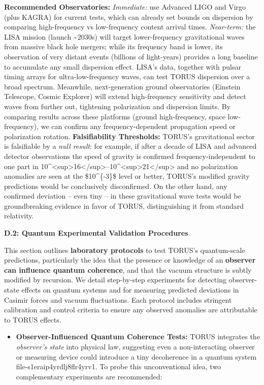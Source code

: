 \documentclass[]{article}
\begin{document}
\textbf{Recommended Observatories:} \emph{Immediate:} use Advanced LIGO
and Virgo (plus KAGRA) for current tests, which can already set bounds
on dispersion by comparing high-frequency vs low-frequency content
arrival times​. \emph{Near-term:} the LISA mission (launch
\textasciitilde{}2030s) will target lower-frequency gravitational waves
from massive black hole mergers; while its frequency band is lower, its
observation of very distant events (billions of light-years) provides a
long baseline to accumulate any small dispersion effect​. LISA's data,
together with pulsar timing arrays for ultra-low-frequency waves, can
test TORUS dispersion over a broad spectrum. Meanwhile, next-generation
ground observatories (Einstein Telescope, Cosmic Explorer) will extend
high-frequency sensitivity and detect waves from further out, tightening
polarization and dispersion limits. By comparing results across these
platforms (ground high-frequency, space low-frequency), we can confirm
any frequency-dependent propagation speed or polarization rotation.
\textbf{Falsifiability Thresholds:} TORUS's gravitational sector is
falsifiable by a \emph{null result}: for example, if after a decade of
LISA and advanced detector observations the speed of gravity is
confirmed frequency-independent to one part in
10\^{}\textless{}sup\textgreater{}16\textless{}/sup\textgreater{}--10\^{}\textless{}sup\textgreater{}21\textless{}/sup\textgreater{}
and no polarization anomalies are seen at the \$10\^{}\{-3\}\$ level or
better, TORUS's modified gravity predictions would be conclusively
disconfirmed​. On the other hand, any confirmed deviation -- even tiny
-- in these gravitational wave tests would be groundbreaking evidence in
favor of TORUS, distinguishing it from standard relativity.

\textbf{D.2: Quantum Experimental Validation Procedures}

This section outlines \textbf{laboratory protocols} to test TORUS's
quantum-scale predictions, particularly the idea that the presence or
knowledge of an \textbf{observer can influence quantum coherence}, and
that the vacuum structure is subtly modified by recursion. We detail
step-by-step experiments for detecting observer-state effects on quantum
systems and for measuring predicted deviations in Casimir forces and
vacuum fluctuations. Each protocol includes stringent calibration and
control criteria to ensure any observed anomalies are attributable to
TORUS effects.

\begin{itemize}
\item
  \textbf{Observer-Influenced Quantum Coherence Tests:} TORUS integrates
  the \emph{observer's state} into physical law, suggesting even a
  non-interacting observer or measuring device could introduce a tiny
  decoherence in a quantum system​file-s1eraip4yrdlj8flr4yrv1. To probe
  this unconventional idea, two complementary experiments are
  recommended:
\end{itemize}
\end{document}
